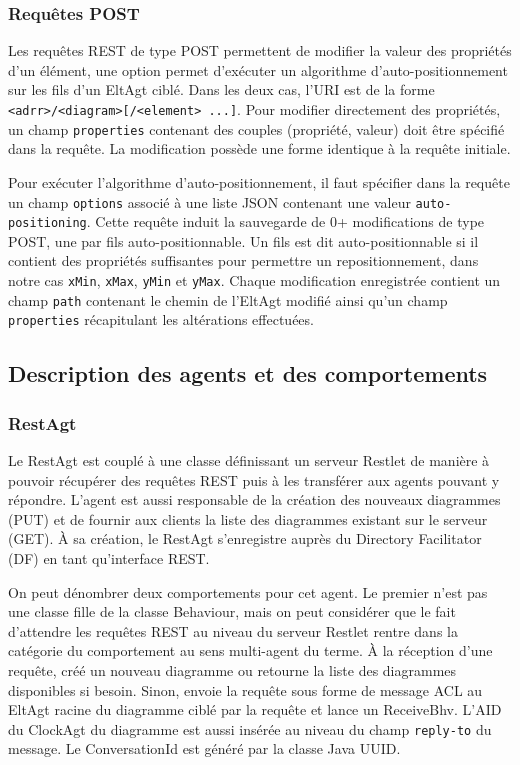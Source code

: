 \subsubsection{Requêtes POST}
Les requêtes REST de type POST permettent de modifier la valeur des propriétés d'un élément, une option permet d’exécuter un algorithme d'auto-positionnement sur les fils d'un EltAgt ciblé.
Dans les deux cas, l'URI est de la forme \lstinline$<adrr>/<diagram>[/<element> ...]$.
Pour modifier directement des propriétés, un champ \lstinline$properties$ contenant des couples (propriété, valeur) doit être spécifié dans la requête.
La modification possède une forme identique à la requête initiale.

Pour exécuter l'algorithme d'auto-positionnement, il faut spécifier dans la requête un champ \lstinline$options$ associé à une liste JSON contenant une valeur \lstinline$auto-positioning$.
Cette requête induit la sauvegarde de 0+ modifications de type POST, une par fils auto-positionnable. Un fils est dit auto-positionnable si il contient des propriétés suffisantes pour permettre un repositionnement, dans notre cas \lstinline$xMin$, \lstinline$xMax$, \lstinline$yMin$ et \lstinline$yMax$.
Chaque modification enregistrée contient un champ \lstinline$path$ contenant le chemin de l'EltAgt modifié ainsi qu'un champ \lstinline$properties$ récapitulant les altérations effectuées.

\newpage
\subsection{Description des agents et des comportements}
\subsubsection{RestAgt}
Le RestAgt est couplé à une classe définissant un serveur Restlet de manière à pouvoir récupérer des requêtes REST puis à les transférer aux agents pouvant y répondre.
L'agent est aussi responsable de la création des nouveaux diagrammes (PUT) et de fournir aux clients la liste des diagrammes existant sur le serveur (GET).
À sa création, le RestAgt s'enregistre auprès du Directory Facilitator (DF) en tant qu'interface REST.

On peut dénombrer deux comportements pour cet agent.
Le premier n'est pas une classe fille de la classe Behaviour, mais on peut considérer que le fait d'attendre les requêtes REST au niveau du serveur Restlet rentre dans la catégorie du comportement au sens multi-agent du terme.
À la réception d'une requête, créé un nouveau diagramme ou retourne la liste des diagrammes disponibles si besoin.
Sinon, envoie la requête sous forme de message ACL au EltAgt racine du diagramme ciblé par la requête et lance un ReceiveBhv.
L'AID du ClockAgt du diagramme est aussi insérée au niveau du champ \lstinline$reply-to$ du message.
Le ConversationId est généré par la classe Java UUID.

